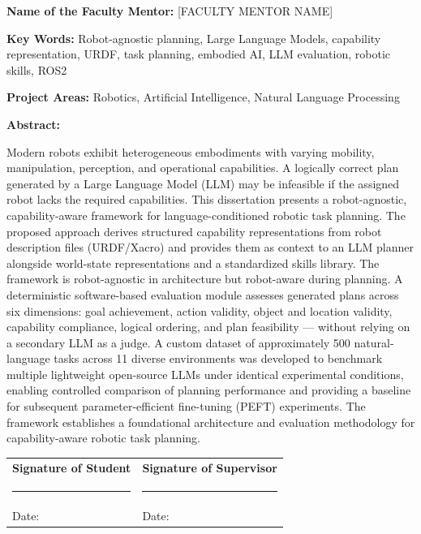 \documentclass[12pt,a4paper]{article}
\begin{document}
\vspace{0.4cm}
\noindent\textbf{Name of the Faculty Mentor:} [FACULTY MENTOR NAME]

\vspace{0.4cm}
\noindent\textbf{Key Words:} Robot-agnostic planning, Large Language Models, capability representation, URDF, task planning, embodied AI, LLM evaluation, robotic skills, ROS2

\vspace{0.4cm}
\noindent\textbf{Project Areas:} Robotics, Artificial Intelligence, Natural Language Processing

\vspace{0.4cm}
\noindent\textbf{Abstract:}

\begin{singlespace}
\noindent
Modern robots exhibit heterogeneous embodiments with varying mobility, manipulation, perception, and operational capabilities.
A logically correct plan generated by a Large Language Model (LLM) may be infeasible if the assigned robot lacks the required capabilities.
This dissertation presents a robot-agnostic, capability-aware framework for language-conditioned robotic task planning.
The proposed approach derives structured capability representations from robot description files (URDF/Xacro) and provides them as context to an LLM planner alongside world-state representations and a standardized skills library.
The framework is robot-agnostic in architecture but robot-aware during planning.
A deterministic software-based evaluation module assesses generated plans across six dimensions: goal achievement, action validity, object and location validity, capability compliance, logical ordering, and plan feasibility --- without relying on a secondary LLM as a judge.
A custom dataset of approximately 500 natural-language tasks across 11 diverse environments was developed to benchmark multiple lightweight open-source LLMs under identical experimental conditions, enabling controlled comparison of planning performance and providing a baseline for subsequent parameter-efficient fine-tuning (PEFT) experiments.
The framework establishes a foundational architecture and evaluation methodology for capability-aware robotic task planning.
\end{singlespace}

\vspace{1.5cm}
\noindent
\begin{tabular}{@{}p{}p{}@{}}
\textbf{Signature of Student} & \textbf{Signature of Supervisor} \\[2.2cm]
\hrule & \hrule \\[0.4cm]
Date: \underline{\hspace{3.5cm}} & Date: \underline{\hspace{3.5cm}}
\end{tabular}
\end{document}
